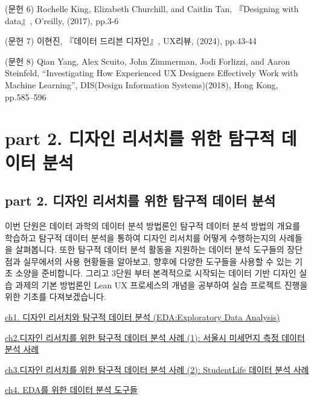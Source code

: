 \documentclass[
  letterpaper,
]{book}
\begin{document}
(문헌 6) Rochelle King, Elizabeth Churchill, and Caitlin Tan,
『Designing with data』, O'reilly, (2017), pp.3-6

(문헌 7) 이현진, 『데이터 드리븐 디자인』, UX리뷰, (2024), pp.43-44

(문헌 8) Qian Yang, Alex Scuito, John Zimmerman, Jodi Forlizzi, and
Aaron Steinfeld, ``Investigating How Experienced UX Designers
Effectively Work with Machine Learning'', DIS(Design Information
Systems)(2018), Hong Kong, pp.585--596

\part{\textbf{part 2. 디자인 리서치를 위한 탐구적 데이터 분석}}

\chapter*{part 2. 디자인 리서치를 위한 탐구적 데이터
분석}\label{part-2.-uxb514uxc790uxc778-uxb9acuxc11cuxce58uxb97c-uxc704uxd55c-uxd0d0uxad6cuxc801-uxb370uxc774uxd130-uxbd84uxc11d-1}


이번 단원은 데이터 과학의 데이터 분석 방법론인 탐구적 데이터 분석 방법의
개요를 학습하고 탐구적 데이터 분석을 통하여 디자인 리서치를 어떻게
수행하는지의 사례들을 살펴봅니다. 또한 탐구적 데이터 분석 활동을
지원하는 데이터 분석 도구들의 장단점과 실무에서의 사용 현황들을
알아보고, 향후에 다양한 도구들을 사용할 수 있는 기초 소양을 준비합니다.
그리고 3단원 부터 본격적으로 시작되는 데이터 기반 디자인 실습 과제의
기본 방법론인 Lean UX 프로세스의 개념을 공부하여 실습 프로젝트 진행을
위한 기초를 다져보겠습니다.

\href{ch1.\%20디자인\%20리서치와\%20탐구적\%20데이터\%20분석.qmd}{ch1.
디자인 리서치와 탐구적 데이터 분석 (EDA:Exploratory Data Analysis)}

\href{ch2.디자인\%20리서치를\%20위한\%20탐구적\%20데이터\%20분석\%20사례\%20(1).qmd}{ch2.디자인
리서치를 위한 탐구적 데이터 분석 사례 (1): 서울시 미세먼지 측정 데이터
분석 사례}

\href{ch3.디자인\%20리서치를\%20위한\%20탐구적\%20데이터\%20분석\%20사례\%20(2).qmd}{ch3.디자인
리서치를 위한 탐구적 데이터 분석 사례 (2): StudentLife 데이터 분석 사례}

\href{ch4.\%20EDA를\%20위한\%20데이터\%20분석\%20도구들.qmd}{ch4. EDA를
위한 데이터 분석 도구들}
\end{document}
